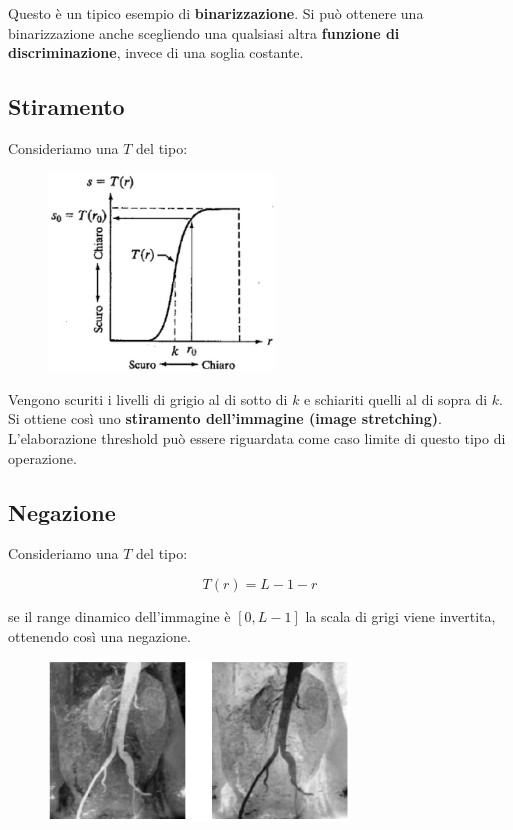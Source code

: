 Questo è un tipico esempio di \textbf{binarizzazione}.
Si può ottenere una binarizzazione anche scegliendo una qualsiasi
altra \textbf{funzione di discriminazione}, invece di una soglia costante.

\subsection{Stiramento}

Consideriamo una $T$ del tipo:

\begin{figure}[H]
    \centering
    \includegraphics[width=6cm, keepaspectratio]{capitoli/immagini/imgs/trasformazione_esempio_2.jpg}
\end{figure}

Vengono scuriti i livelli di grigio al di sotto di $k$ e schiariti quelli al
di sopra di $k$. Si ottiene così uno \textbf{stiramento dell'immagine (image
    stretching)}. L'elaborazione threshold può essere riguardata come
caso limite di questo tipo di operazione.

\subsection{Negazione}

Consideriamo una $T$ del tipo:

$$
    T(r) = L - 1 - r
$$

se il range dinamico dell'immagine è $[0, L - 1]$
la scala di grigi viene invertita, ottenendo così una negazione.

\begin{figure}[H]
    \centering
    \includegraphics[width=8cm, keepaspectratio]{capitoli/immagini/imgs/angiografie_esempio_3.jpg}
\end{figure}

